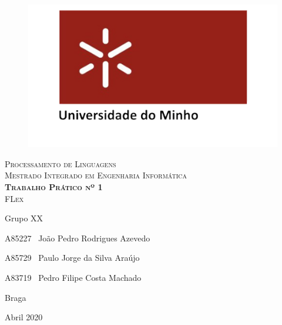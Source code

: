\documentclass[a4paper,12pt]{report}
\begin{document}


\begin{titlepage}
    \center
    {

    \begin{figure}[t]
        \centering
        \includegraphics[scale=0.4]{images/uminho.png}
        \label{img:logo}
        \vspace{2.0cm}
    \end{figure}

    \vspace{3.0cm}
    \textsc{\Huge Processamento de Linguagens}\\[0.5cm]
    \textsc{\Large{Mestrado Integrado em Engenharia Informática}}\\[0.5cm]
    \vspace{3cm}
    \textsc{\textbf{\Huge{Trabalho Prático nº 1}}}\\[1cm]
    \textsc{\huge{FLex}}\\[1cm]
    \vspace{4cm}
    \begin{flushleft}

        \vspace{1cm}
        \large Grupo XX
        \vspace{0.5cm}

        \large A85227 \,\,\,João Pedro Rodrigues Azevedo
        \vspace{0.2cm}

        A85729 \,\,\,Paulo Jorge da Silva Araújo
        \vspace{0.2cm}

        A83719 \,\,\,Pedro Filipe Costa Machado
        \vspace{0.2cm}

    \end{flushleft}
    \begin{flushright}
        Braga

        Abril 2020
    \end{flushright}

\date{\today}
}
\end{titlepage}
\end{document}
